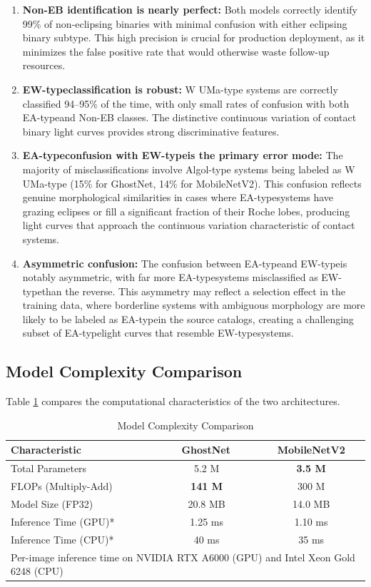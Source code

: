 \documentclass[11pt,a4paper]{article}
\newcommand{\EA}{EA-type}
\newcommand{\EW}{EW-type}
\begin{document}
\begin{enumerate}
    \item \textbf{Non-EB identification is nearly perfect:} Both models correctly identify 99\% of non-eclipsing binaries with minimal confusion with either eclipsing binary subtype. This high precision is crucial for production deployment, as it minimizes the false positive rate that would otherwise waste follow-up resources.
    
    \item \textbf{\EW classification is robust:} W UMa-type systems are correctly classified 94--95\% of the time, with only small rates of confusion with both \EA and Non-EB classes. The distinctive continuous variation of contact binary light curves provides strong discriminative features.
    
    \item \textbf{\EA confusion with \EW is the primary error mode:} The majority of misclassifications involve Algol-type systems being labeled as W UMa-type (15\% for GhostNet, 14\% for MobileNetV2). This confusion reflects genuine morphological similarities in cases where \EA systems have grazing eclipses or fill a significant fraction of their Roche lobes, producing light curves that approach the continuous variation characteristic of contact systems.
    
    \item \textbf{Asymmetric confusion:} The confusion between \EA and \EW is notably asymmetric, with far more \EA systems misclassified as \EW than the reverse. This asymmetry may reflect a selection effect in the training data, where borderline systems with ambiguous morphology are more likely to be labeled as \EA in the source catalogs, creating a challenging subset of \EA light curves that resemble \EW systems.
\end{enumerate}

\subsection{Model Complexity Comparison}

Table \ref{tab:complexity} compares the computational characteristics of the two architectures.

\begin{table}[htbp]
\centering
\caption{Model Complexity Comparison}
\label{tab:complexity}
\begin{tabular}{lcc}
\toprule
\textbf{Characteristic} \ &  \textbf{GhostNet} \ &  \textbf{MobileNetV2} \\
\midrule
Total Parameters \ &  5.2 M \ &  \textbf{3.5 M} \\
FLOPs (Multiply-Add) \ &  \textbf{141 M} \ &  300 M \\
Model Size (FP32) \ &  20.8 MB \ &  14.0 MB \\
Inference Time (GPU)* \ &  1.25 ms \ &  1.10 ms \\
Inference Time (CPU)* \ &  40 ms \ &  35 ms \\
\bottomrule
\multicolumn{3}{l}{\footnotesize *Per-image inference time on NVIDIA RTX A6000 (GPU) and Intel Xeon Gold 6248 (CPU)}
\end{tabular}
\end{table}
\end{document}
